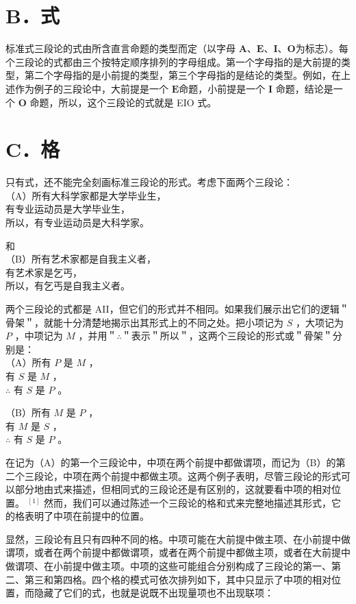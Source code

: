 \section*{B．式}
标准式三段论的式由所含直言命题的类型而定（以字母 $\mathbf{A 、 E 、 I 、 O}$为标志）。每个三段论的式都由三个按特定顺序排列的字母组成。第一个字母指的是大前提的类型，第二个字母指的是小前提的类型，第三个字母指的是结论的类型。例如，在上述作为例子的三段论中，大前提是一个 $\mathbf{E}$命题，小前提是一个 $\mathbf{I}$ 命题，结论是一个 $\mathbf{O}$ 命题，所以，这个三段论的式就是 EIO 式。

\section*{C．格}
只有式，还不能完全刻画标准三段论的形式。考虑下面两个三段论：\\
（A）所有大科学家都是大学毕业生，\\
有专业运动员是大学毕业生，\\
所以，有专业运动员是大科学家。

和\\
（B）所有艺术家都是自我主义者，\\
有艺术家是乞丐，\\
所以，有乞丐是自我主义者。

两个三段论的式都是 AII，但它们的形式并不相同。如果我们展示出它们的逻辑＂骨架＂，就能十分清楚地揭示出其形式上的不同之处。把小项记为 $S$ ，大项记为 $P$ ，中项记为 $M$ ，并用＂$\therefore$＂表示＂所以＂，这两个三段论的形式或＂骨架＂分别是：\\
（A）所有 $P$ 是 $M$ ，\\
有 $S$ 是 $M$ ，\\
$\therefore$ 有 $S$ 是 $P$ 。

（B）所有 $M$ 是 $P$ ，\\
有 $M$ 是 $S$ ，\\
$\therefore$ 有 $S$ 是 $P$ 。

在记为（A）的第一个三段论中，中项在两个前提中都做谓项，而记为（B）的第二个三段论，中项在两个前提中都做主项。这两个例子表明，尽管三段论的形式可以部分地由式来描述，但相同式的三段论还是有区别的，这就要看中项的相对位置。 ${ }^{[1]}$ 然而，我们可以通过陈述一个三段论的格和式来完整地描述其形式，它的格表明了中项在前提中的位置。

显然，三段论有且只有四种不同的格。中项可能在大前提中做主项、在小前提中做谓项，或者在两个前提中都做谓项，或者在两个前提中都做主项，或者在大前提中做谓项、在小前提中做主项。中项的这些可能组合分别构成了三段论的第一、第二、第三和第四格。四个格的模式可依次排列如下，其中只显示了中项的相对位置，而隐藏了它们的式，也就是说既不出现量项也不出现联项：

